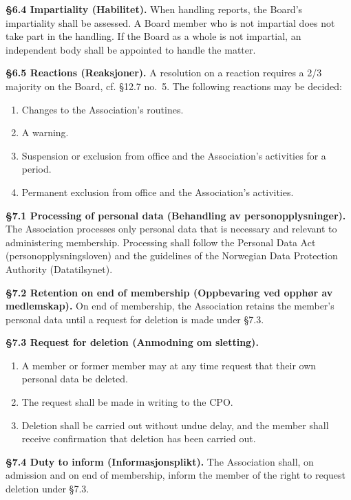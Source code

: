 \documentclass{../../../Common/Latex/Templates/rapport}
\begin{document}
\textbf{\S 6.4 Impartiality (Habilitet).} When handling reports, the Board's impartiality shall be assessed. A Board member who is not impartial does not take part in the handling. If the Board as a whole is not impartial, an independent body shall be appointed to handle the matter.

\textbf{\S 6.5 Reactions (Reaksjoner).} A resolution on a reaction requires a 2/3 majority on the Board, cf. \S12.7 no.\ 5. The following reactions may be decided:
\begin{enumerate}
  \item Changes to the Association's routines.
  \item A warning.
  \item Suspension or exclusion from office and the Association's activities for a period.
  \item Permanent exclusion from office and the Association's activities.
\end{enumerate}

\textbf{\S 7.1 Processing of personal data (Behandling av personopplysninger).} The Association processes only personal data that is necessary and relevant to administering membership. Processing shall follow the Personal Data Act (personopplysningsloven) and the guidelines of the Norwegian Data Protection Authority (Datatilsynet).

\textbf{\S 7.2 Retention on end of membership (Oppbevaring ved opphør av medlemskap).} On end of membership, the Association retains the member's personal data until a request for deletion is made under \S7.3.

\textbf{\S 7.3 Request for deletion (Anmodning om sletting).}
\begin{enumerate}
  \item A member or former member may at any time request that their own personal data be deleted.
  \item The request shall be made in writing to the CPO.
  \item Deletion shall be carried out without undue delay, and the member shall receive confirmation that deletion has been carried out.
\end{enumerate}

\textbf{\S 7.4 Duty to inform (Informasjonsplikt).} The Association shall, on admission and on end of membership, inform the member of the right to request deletion under \S7.3.


\end{document}
